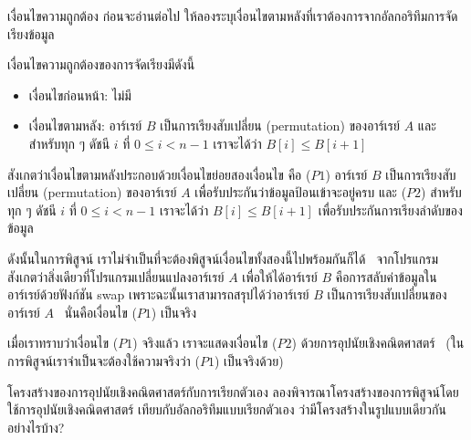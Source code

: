 \begin{quiz}{เงื่อนไข{\wbr}ความ{\wbr}ถูกต้อง}
ก่อน{\wbr}จะ{\wbr}อ่าน{\wbr}ต่อไป ให้{\wbr}ลอง{\wbr}ระบุ{\wbr}เงื่อนไข{\wbr}ตาม{\wbr}หลัง{\wbr}ที่{\wbr}เรา{\wbr}ต้องการ{\wbr}จาก{\wbr}อัล{\wbr}กอ{\wbr}ริ{\wbr}ทึม{\wbr}การ{\wbr}จัดเรียง{\wbr}ข้อมูล{\wbr}
\end{quiz}

เงื่อนไข{\wbr}ความ{\wbr}ถูกต้อง{\wbr}ของ{\wbr}การ{\wbr}จัดเรียง{\wbr}มี{\wbr}ดังนี้{\wbr}
\begin{itemize}
\item เงื่อนไข{\wbr}ก่อนหน้า: ไม่{\wbr}มี{\wbr}
\item เงื่อนไข{\wbr}ตาม{\wbr}หลัง: อาร์เรย์ $B$ เป็น{\wbr}การ{\wbr}เรียง{\wbr}สับเปลี่ยน (permutation) ของ{\wbr}อาร์เรย์ $A$ และ{\wbr}สำหรับ{\wbr}ทุก ๆ ดัชนี $i$ ที่ $0\leq i<n-1$ เรา{\wbr}จะ{\wbr}ได้{\wbr}ว่า $B[i]\leq B[i+1]$
\end{itemize}

สังเกต{\wbr}ว่า{\wbr}เงื่อนไข{\wbr}ตาม{\wbr}หลัง{\wbr}ประกอบ{\wbr}ด้วย{\wbr}เงื่อนไข{\wbr}ย่อย{\wbr}สอง{\wbr}เงื่อนไข คือ ($P1$) อาร์เรย์ $B$
เป็น{\wbr}การ{\wbr}เรียง{\wbr}สับเปลี่ยน (permutation) ของ{\wbr}อาร์เรย์ $A$
เพื่อ{\wbr}รับประกัน{\wbr}ว่า{\wbr}ข้อมูล{\wbr}ป้อน{\wbr}เข้า{\wbr}จะ{\wbr}อยู่{\wbr}ครบ และ ($P2$) สำหรับ{\wbr}ทุก ๆ ดัชนี $i$ ที่ $0\leq
i<n-1$ เรา{\wbr}จะ{\wbr}ได้{\wbr}ว่า $B[i]\leq B[i+1]$ เพื่อ{\wbr}รับประกัน{\wbr}การ{\wbr}เรียงลำดับ{\wbr}ของ{\wbr}ข้อมูล{\wbr}

ดังนั้น{\wbr}ใน{\wbr}การ{\wbr}พิสูจน์ เรา{\wbr}ไม่{\wbr}จำเป็น{\wbr}ที่{\wbr}จะ{\wbr}ต้อง{\wbr}พิสูจน์{\wbr}เงื่อนไข{\wbr}ทั้ง{\wbr}สอง{\wbr}นี้{\wbr}ไป{\wbr}พร้อมกัน{\wbr}ก็ได้ \ จาก{\wbr}โปรแกรม{\wbr}
สังเกต{\wbr}ว่า{\wbr}สิ่ง{\wbr}เดียว{\wbr}ที่{\wbr}โปรแกรม{\wbr}เปลี่ยนแปลง{\wbr}อาร์เรย์ $A$ เพื่อให้{\wbr}ได้{\wbr}อาร์เรย์ $B$
คือ{\wbr}การ{\wbr}สลับ{\wbr}ค่า{\wbr}ข้อมูล{\wbr}ใน{\wbr}อาร์เรย์{\wbr}ด้วย{\wbr}ฟังก์ชัน {\ct swap}
เพราะฉะนั้น{\wbr}เรา{\wbr}สามารถ{\wbr}สรุป{\wbr}ได้{\wbr}ว่า{\wbr}อาร์เรย์ $B$ เป็น{\wbr}การ{\wbr}เรียง{\wbr}สับเปลี่ยน{\wbr}ของ{\wbr}อาร์เรย์ $A$
\ นั่น{\wbr}คือ{\wbr}เงื่อนไข ($P1$) เป็นจริง{\wbr}

เมื่อ{\wbr}เรา{\wbr}ทราบ{\wbr}ว่า{\wbr}เงื่อนไข ($P1$) จริง{\wbr}แล้ว เรา{\wbr}จะ{\wbr}แสดง{\wbr}เงื่อนไข ($P2$)
ด้วย{\wbr}การ{\wbr}อุปนัย{\wbr}เชิง{\wbr}คณิตศาสตร์ \ (ใน{\wbr}การ{\wbr}พิสูจน์{\wbr}เรา{\wbr}จำเป็น{\wbr}จะ{\wbr}ต้อง{\wbr}ใช้{\wbr}ความจริง{\wbr}ว่า ($P1$)
เป็นจริง{\wbr}ด้วย)

\begin{quiz}{โครงสร้าง{\wbr}ของ{\wbr}การ{\wbr}อุปนัย{\wbr}เชิง{\wbr}คณิตศาสตร์{\wbr}กับ{\wbr}การ{\wbr}เรียก{\wbr}ตัวเอง}
ลอง{\wbr}พิจารณา{\wbr}โครงสร้าง{\wbr}ของ{\wbr}การ{\wbr}พิสูจน์{\wbr}โดย{\wbr}ใช้{\wbr}การ{\wbr}อุปนัย{\wbr}เชิง{\wbr}คณิตศาสตร์{\wbr}
เทียบ{\wbr}กับ{\wbr}อัล{\wbr}กอ{\wbr}ริ{\wbr}ทึม{\wbr}แบบ{\wbr}เรียก{\wbr}ตัวเอง ว่า{\wbr}มี{\wbr}โครงสร้าง{\wbr}ใน{\wbr}รูปแบบ{\wbr}เดียวกัน{\wbr}อย่างไร{\wbr}บ้าง?
\end{quiz}

